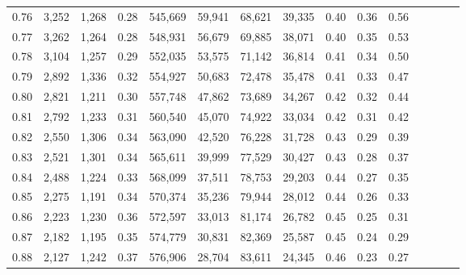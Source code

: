 \begin{tabular}{rrrcrrrrrrrrrrr}
0.76 &   3,252 &   1,268 &                                       0.28 &  545,669 &   59,941 &   68,621 &   39,335 &  0.40 &  0.36 &                         0.56 \\
0.77 &   3,262 &   1,264 &                                       0.28 &  548,931 &   56,679 &   69,885 &   38,071 &  0.40 &  0.35 &                         0.53 \\
0.78 &   3,104 &   1,257 &                                       0.29 &  552,035 &   53,575 &   71,142 &   36,814 &  0.41 &  0.34 &                         0.50 \\
0.79 &   2,892 &   1,336 &                                       0.32 &  554,927 &   50,683 &   72,478 &   35,478 &  0.41 &  0.33 &                         0.47 \\
0.80 &   2,821 &   1,211 &                                       0.30 &  557,748 &   47,862 &   73,689 &   34,267 &  0.42 &  0.32 &                         0.44 \\
0.81 &   2,792 &   1,233 &                                       0.31 &  560,540 &   45,070 &   74,922 &   33,034 &  0.42 &  0.31 &                         0.42 \\
0.82 &   2,550 &   1,306 &                                       0.34 &  563,090 &   42,520 &   76,228 &   31,728 &  0.43 &  0.29 &                         0.39 \\
0.83 &   2,521 &   1,301 &                                       0.34 &  565,611 &   39,999 &   77,529 &   30,427 &  0.43 &  0.28 &                         0.37 \\
0.84 &   2,488 &   1,224 &                                       0.33 &  568,099 &   37,511 &   78,753 &   29,203 &  0.44 &  0.27 &                         0.35 \\
0.85 &   2,275 &   1,191 &                                       0.34 &  570,374 &   35,236 &   79,944 &   28,012 &  0.44 &  0.26 &                         0.33 \\
0.86 &   2,223 &   1,230 &                                       0.36 &  572,597 &   33,013 &   81,174 &   26,782 &  0.45 &  0.25 &                         0.31 \\
0.87 &   2,182 &   1,195 &                                       0.35 &  574,779 &   30,831 &   82,369 &   25,587 &  0.45 &  0.24 &                         0.29 \\
0.88 &   2,127 &   1,242 &                                       0.37 &  576,906 &   28,704 &   83,611 &   24,345 &  0.46 &  0.23 &                         0.27 \\

\end{tabular}

